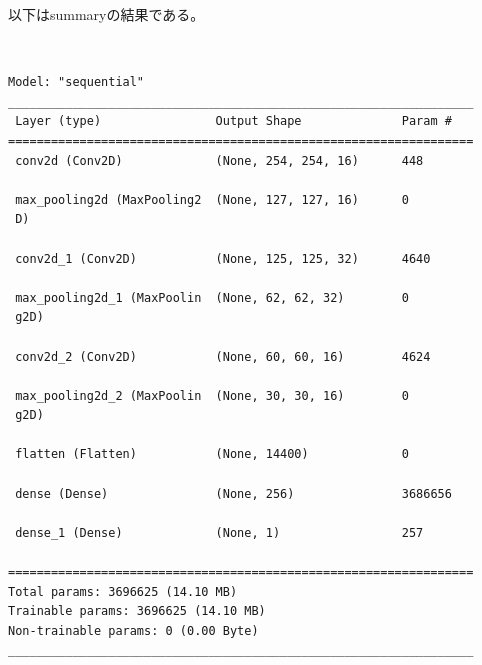 \documentclass[a4paper, 11pt, titlepage]{jsarticle}
\begin{document}
以下はsummaryの結果である。\par
　\par
{\fontsize{10pt}{8pt}\selectfont
\begin{BVerbatim}
Model: "sequential"
_________________________________________________________________
 Layer (type)                Output Shape              Param #   
=================================================================
 conv2d (Conv2D)             (None, 254, 254, 16)      448       
                                                                 
 max_pooling2d (MaxPooling2  (None, 127, 127, 16)      0         
 D)                                                              
                                                                 
 conv2d_1 (Conv2D)           (None, 125, 125, 32)      4640      
                                                                 
 max_pooling2d_1 (MaxPoolin  (None, 62, 62, 32)        0         
 g2D)                                                            
                                                                 
 conv2d_2 (Conv2D)           (None, 60, 60, 16)        4624      
                                                                 
 max_pooling2d_2 (MaxPoolin  (None, 30, 30, 16)        0         
 g2D)                                                            
                                                                 
 flatten (Flatten)           (None, 14400)             0         
                                                                 
 dense (Dense)               (None, 256)               3686656   
                                                                 
 dense_1 (Dense)             (None, 1)                 257       
                                                                 
=================================================================
Total params: 3696625 (14.10 MB)
Trainable params: 3696625 (14.10 MB)
Non-trainable params: 0 (0.00 Byte)
_________________________________________________________________
\end{BVerbatim}
}
\end{document}
